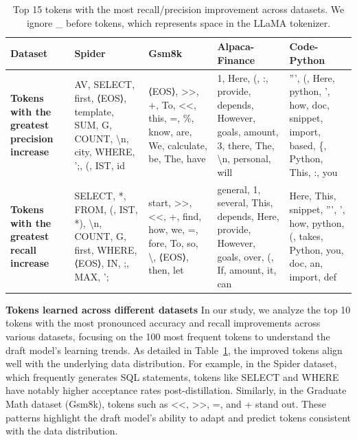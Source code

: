 \begin{table}[h!]
\vspace{-10pt}
\caption{Top 15 tokens with the most recall/precision improvement across datasets. We ignore \_ before tokens, which represents space in the LLaMA tokenizer.}
\label{tab:tokens}
\begin{center}
\begin{footnotesize}
\begin{tabular}{p{1.5cm}|p{2.4cm}|p{2.4cm}|p{2.4cm}|p{2.4cm}}
\toprule
{\bf Dataset} & {\bf Spider} & {\bf Gsm8k} & {\bf Alpaca-Finance} & {\bf Code-Python} \\
\midrule
{\bf Tokens with the greatest precision increase}
&
AV, SELECT, first, ⟨EOS⟩, template, SUM, G, COUNT, \textbackslash n, city, WHERE, ';, (, IST, id
&
⟨EOS⟩, \textgreater\textgreater, +, To, \textless\textless, this, =, \%, know, are, We, calculate, be, The, have
&
1, Here, (, :, provide, depends, However, goals, amount, 3, there, The, \textbackslash n, personal, will
&
''', (, Here, python, ', how, doc, snippet, import, based, \{, Python, This, :, you \\
\hline
{\bf Tokens with the greatest recall increase}
&
SELECT, *, FROM, (, IST, *), \textbackslash n, COUNT, G, first, WHERE, ⟨EOS⟩, IN, ;, MAX, ';
&
start, \textgreater\textgreater, \textless\textless, +, find, how, we, =, fore, To, so, \textbackslash, ⟨EOS⟩, then, let
&
general, 1, several, This, depends, Here, provide, However, goals, over, (, If, amount, it, can
&
Here, This, snippet, ''', ', how, python, (, takes, Python, you, doc, an, import, def \\
\bottomrule
\end{tabular}
\end{footnotesize}
\end{center}
\vspace{-10pt}
\end{table}

{\bf Tokens learned across different datasets}
In our study, we analyze the top 10 tokens with the most pronounced accuracy and recall improvements across various datasets, focusing on the 100 most frequent tokens to 
understand the draft model's learning trends. As detailed in Table~\ref{tab:tokens}, the improved tokens align well with the underlying data distribution. 
For example, in the Spider dataset, which frequently generates SQL statements, tokens like SELECT and WHERE have notably higher acceptance rates post-distillation. 
Similarly, in the Graduate Math dataset (Gsm8k), tokens such as \textless\textless, \textgreater\textgreater, =, and + stand out. 
These patterns highlight the draft model's ability to adapt and predict tokens consistent with the data distribution.













